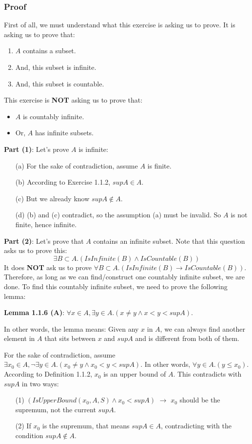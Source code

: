 \documentclass[12pt, letterpaper, oneside]{book}
\begin{document}
\subsubsection{Proof}

First of all, we must understand what this exercise is asking us to prove. It is asking us to prove that:
\begin{enumerate}
  \item $A$ contains a subset.
  \item And, this subset is infinite.
  \item And, this subset is countable.
\end{enumerate}

This exercise is \textbf{NOT} asking us to prove that:
\begin{itemize}
  \item $A$ is countably infinite.
  \item Or, $A$ has infinite subsets.
\end{itemize}

\textbf{Part (1)}: Let's prove $A$ is infinite:
\begin{enumerate}
  \item[(a)] For the sake of contradiction, assume $A$ is finite.
  \item[(b)] According to Exercise 1.1.2, $sup A \in A$.
  \item[(c)] But we already know $sup A \notin A$.
  \item[(d)] (b) and (c) contradict, so the assumption (a) must be invalid. So $A$ is not finite, hence infinite.
\end{enumerate}

\textbf{Part (2)}: Let's prove that $A$ contains an infinite subset. Note that this question asks us to prove this:
\[\exists B \subset A. (IsInfinite(B) \land IsCountable(B))\]
It does \textbf{NOT} ask us to prove $\forall B \subset A. (IsInfinite(B) \rightarrow IsCountable(B))$. Therefore, as
long as we can find/construct one countably infinite subset, we are done. To find this countably infinite subset, we
need to prove the following lemma:

\textbf{Lemma 1.1.6 (A)}: $\forall x \in A, \exists y \in A. (x \ne y \land x < y < sup A)$.

In other words, the lemma means: Given any $x$ in $A$, we can always find another element in $A$ that sits between $x$
and $supA$ and is different from both of them.

For the sake of contradiction, assume $\exists x_0 \in A, \lnot \exists y \in A. (x_0 \ne y \land x_0 < y < sup A)$. In
other words, $\forall y \in A. (y \leqslant x_0)$. According to Definition 1.1.2, $x_0$ is an upper bound of $A$. This
contradicts with $sup A$ in two ways:
\begin{enumerate}
  \item[(1)] $(IsUpperBound(x_0, A, S) \land x_0 < sup A)$ $\rightarrow$ $x_0$ should be the supremum, not the current
        $sup A$.
  \item[(2)] If $x_0$ is the supremum, that means $sup A \in A$, contradicting with the condition $sup A \notin A$.
\end{enumerate}
\end{document}
